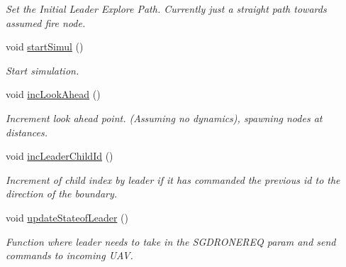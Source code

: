 \begin{DoxyCompactItemize}
\begin{DoxyCompactList}\small\item\em Set the Initial Leader Explore Path. Currently just a straight path towards assumed fire node. \end{DoxyCompactList}\item 
\mbox{\label{classrnl_1_1Planner_a3d3b41095712f8a65c86e3b694b5f70f}} 
void \hyperlink{classrnl_1_1Planner_a3d3b41095712f8a65c86e3b694b5f70f}{start\+Simul} ()
\begin{DoxyCompactList}\small\item\em Start simulation. \end{DoxyCompactList}\item 
\mbox{\label{classrnl_1_1Planner_ad9ef774cd7e0decc0cf729f71534f934}} 
void \hyperlink{classrnl_1_1Planner_ad9ef774cd7e0decc0cf729f71534f934}{inc\+Look\+Ahead} ()
\begin{DoxyCompactList}\small\item\em Increment look ahead point. (Assuming no dynamics), spawning nodes at distances. \end{DoxyCompactList}\item 
\mbox{\label{classrnl_1_1Planner_ade7d00706a6c826a44fc4bd8c805cf51}} 
void \hyperlink{classrnl_1_1Planner_ade7d00706a6c826a44fc4bd8c805cf51}{inc\+Leader\+Child\+Id} ()
\begin{DoxyCompactList}\small\item\em Increment of child index by leader if it has commanded the previous id to the direction of the boundary. \end{DoxyCompactList}\item 
\mbox{\label{classrnl_1_1Planner_a61c9786d8f9ca653d6a64509a1f6749d}} 
void \hyperlink{classrnl_1_1Planner_a61c9786d8f9ca653d6a64509a1f6749d}{update\+Stateof\+Leader} ()
\begin{DoxyCompactList}\small\item\em Function where leader needs to take in the S\+G\+D\+R\+O\+N\+E\+R\+EQ param and send commands to incoming U\+AV. \end{DoxyCompactList}\item 
\mbox{\label{classrnl_1_1Planner_a061cc38c2b562945f8ee8b6b8a1772a4}} 

\end{DoxyCompactItemize}
